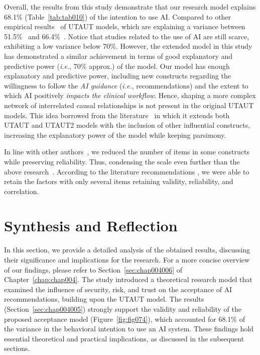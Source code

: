 Overall, the results from this study demonstrate that our research model explains 68.1\% (Table~\ref{tab:tab010}) of the intention to use \ac{AI}.
Compared to other empirical results~\cite{LIU2022107026, CALISTO2022102922} of \ac{UTAUT} models, which are explaining a variance between 51.5\%~\cite{LIU2022107026} and 66.4\%~\cite{CALISTO2022102922}.
Notice that studies related to the use of \ac{AI} are still scarce, exhibiting a low variance below 70\%.
However, the extended model in this study has demonstrated a similar achievement in terms of good explanatory and predictive power ({\it i.e.}, 70\% approx.) of the model.
Our model has enough explanatory and predictive power, including new constructs regarding the willingness to follow the {\it AI guidance} ({\it i.e.}, recommendations) and the extent to which \ac{AI} positively {\it impacts the clinical workflow}.
Hence, shaping a more complex network of interrelated causal relationships is not present in the original \ac{UTAUT} models.
This idea borrowed from the literature~\cite{KHALILZADEH2017460, SIGERSON201887} in which it extends both \ac{UTAUT} and \ac{UTAUT}2 models with the inclusion of other influential constructs, increasing the explanatory power of the model while keeping parsimony.

In line with other authors~\cite{CALISTO2022102922}, we reduced the number of items in some constructs while preserving reliability.
Thus, condensing  the scale even further than the above research~\cite{KHALILZADEH2017460}.
According to the literature recommendations \cite{SIGERSON201887}, we were able to retain the factors with only several items retaining validity, reliability, and correlation.

\section{Synthesis and Reflection}
\label{chap:app002005}

In this section, we provide a detailed analysis of the obtained results, discussing their significance and implications for the research.
For a more concise overview of our findings, please refer to Section~\ref{sec:chap004006} of Chapter~\ref{chap:chap004}.
The study introduced a theoretical research model that examined the influence of security, risk, and trust on the acceptance of \ac{AI} recommendations, building upon the \ac{UTAUT} model.
The results (Section~\ref{sec:chap004005}) strongly support the validity and reliability of the proposed acceptance model (Figure~\ref{fig:fig074}), which accounted for 68.1\% of the variance in the behavioral intention to use an AI system.
These findings hold essential theoretical and practical implications, as discussed in the subsequent sections.

